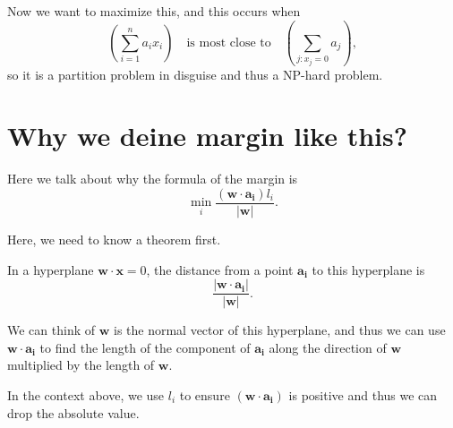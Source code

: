 Now we want to maximize this, and this occurs when
\[
 \left( \sum_{i=1}^n a_i x_i  \right) \quad \text{is most close to} \quad  \left( \sum_{j: x_j = 0} a_j \right),
\]
so it is a partition problem in disguise and thus a NP-hard problem.

\section{Why we deine margin like this?} \label{appendix: margin}

Here we talk about why the formula of the margin is
\[
  \min _i \frac{\left( \mathbf{w} \cdot \mathbf{a_i}  \right) l_i}{\left\vert \mathbf{w}  \right\vert }.
\]

Here, we need to know a theorem first. 
\begin{theorem}
  In a hyperplane \(\mathbf{w} \cdot \mathbf{x} = 0\), the distance from a point \(\mathbf{a_i} \) to this hyperplane is 
  \[
    \frac{\left\vert \mathbf{w} \cdot \mathbf{a_i}  \right\vert}{\vert \mathbf{w}  \vert }.
  \]  
\end{theorem}

We can think of \(\mathbf{w} \) is the normal vector of this hyperplane, and thus we can use \(\mathbf{w} \cdot \mathbf{a_i} \) to find the length of the component of \(\mathbf{a_i} \) along the direction of \(\mathbf{w} \) multiplied by the length of \(\mathbf{w} \).   

In the context above, we use \(l_i\) to ensure \(\left( \mathbf{w} \cdot \mathbf{a_i}  \right) \) is positive and thus we can drop the absolute value. 

